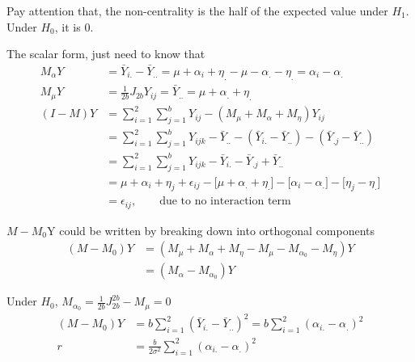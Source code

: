 \begin{itemize}
 Pay attention that, the non-centrality is the half of the expected value under $H_1$. Under $H_0$, it is 0.
 
 The scalar form, just need to know that 
   \begin{align*}
M_{\alpha} Y &= \bar{Y}_{i.} - \bar{Y}_{..}= \mu + \alpha_{i} + \eta_{.}  -\mu - \alpha_{.} - \eta_{.} = \alpha_{i} - \alpha_{.} \\
M_{\mu} Y &= \frac{1}{2b} J_{2b} Y_{ij} = \bar{Y}_{..} = \mu + \alpha_{.} + \eta_{.} \\
(I-M) Y &=  \sum_{i=1}^2 \sum_{j=1}^b  Y_{ij} - (M_{\mu} + M_{\alpha} + M_{\eta}) Y_{ij} \\
&=\sum_{i=1}^2 \sum_{j=1}^b  Y_{ijk} - \bar{Y}_{..} - (\bar{Y}_{i.} - \bar{Y}_{..}) - (\bar{Y}_{.j} - \bar{Y}_{..})\\
&= \sum_{i=1}^2 \sum_{j=1}^b Y_{ijk} - \bar{Y}_{i.} - \bar{Y}_{.j} + \bar{Y}_{..} \\
&= \mu + \alpha_{i} + \eta_{j} + \epsilon_{ij} - \Big[\mu + \alpha_{.} + \eta_{.}  \Big] - \Big[ \alpha_{i} - \alpha_{.}\Big] - \Big[ \eta_{j} - \eta_{.}\Big] \\
&= \epsilon_{ij} , \qquad \text{due to no interaction term}
 \end{align*}
 
 $M-M_0$Y could be written by breaking down into orthogonal components
\begin{align*}
(M - M_0) Y &= (M_{\mu} + M_{\alpha} + M_{\eta} - M_{\mu} - M_{\alpha_0} - M_{\eta}) Y \\
&= (M_{\alpha} - M_{\alpha_0})Y
 \end{align*}
 
 Under $H_0$, $M_{\alpha_0} = \frac{1}{2b}J_{2b}^{2b} - M_{\mu} = 0$ 
 \begin{align*}
(M - M_0) Y &= b \sum_{i=1}^2 (\bar{Y}_{i.} - \bar{Y}_{..})^2 = b \sum_{i=1}^2 (\alpha_{i.} - \alpha_{.})^2 \\
r &= \frac{b}{2 \sigma^2} \sum_{i=1}^2 (\alpha_{i.} - \alpha_{.})^2
 \end{align*}
 
 
 \end{itemize}
 
 